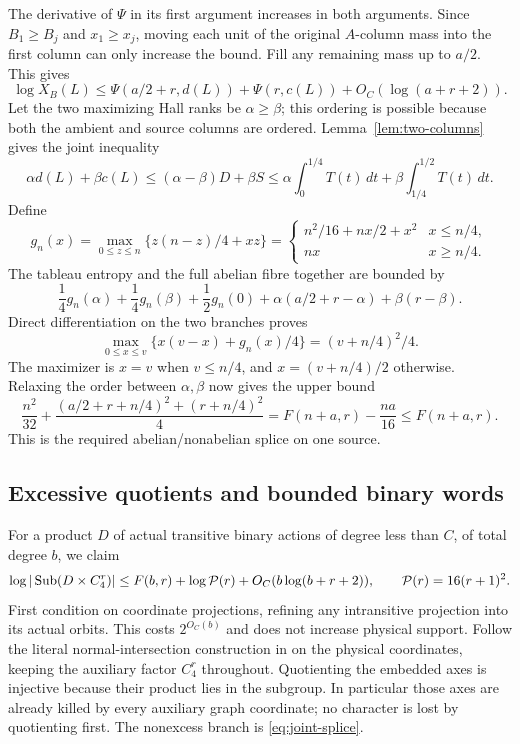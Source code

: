The derivative of $\Psi$ in its first argument increases in both
arguments. Since $B_1\geq B_j$ and $x_1\geq x_j$, moving each unit
of the original $A$-column mass into the first column can only increase
the bound. Fill any remaining mass up to $a/2$. This gives
\begin{equation}\label{eq:packet-columns}
 \log X_B(L)\leq\Psi(a/2+r,d(L))+\Psi(r,c(L))
                              +O_C(\log(a+r+2)).
\end{equation}
Let the two maximizing Hall ranks be $\alpha\geq\beta$; this ordering
is possible because both the ambient and source columns are ordered.
Lemma~\ref{lem:two-columns} gives the joint inequality
\[
 \alpha d(L)+\beta c(L)
 \leq(\alpha-\beta)D+\beta S
 \leq\alpha\int_0^{1/4}T(t)\,dt
         +\beta\int_{1/4}^{1/2}T(t)\,dt.
\]
Define
\[
 g_n(x)=\max_{0\leq z\leq n}\{z(n-z)/4+xz\}
 =\begin{cases}n^2/16+nx/2+x^2&x\leq n/4,\\nx&x\geq n/4.\end{cases}
\]
The tableau entropy and the full abelian fibre together are bounded by
\[
 \frac14g_n(\alpha)+\frac14g_n(\beta)+\frac12g_n(0)
       +\alpha(a/2+r-\alpha)+\beta(r-\beta).
\]
Direct differentiation on the two branches proves
\[
 \max_{0\leq x\leq v}\{x(v-x)+g_n(x)/4\}
       =(v+n/4)^2/4.
\]
The maximizer is $x=v$ when $v\leq n/4$, and
$x=(v+n/4)/2$ otherwise. Relaxing the order between $\alpha,\beta$
now gives the upper bound
\begin{equation}\label{eq:joint-splice}
 \frac{n^2}{32}
 +\frac{(a/2+r+n/4)^2+(r+n/4)^2}{4}
 =F(n+a,r)-\frac{na}{16}\leq F(n+a,r).
\end{equation}
This is the required abelian/nonabelian splice on one source.

\subsection{Excessive quotients and bounded binary words}
For a product $D$ of actual transitive binary actions of degree less
than $C$, of total degree $b$, we claim
\begin{equation}\label{eq:bounded-C4}
 \log|\operatorname{Sub}(D\times C_4^r)|
       \leq F(b,r)+\log\mathcal P(r)+O_C(b\log(b+r+2)),
 \qquad \mathcal P(r)=16(r+1)^2.
\end{equation}
First condition on coordinate projections, refining any intransitive
projection into its actual orbits. This costs $2^{O_C(b)}$ and does
not increase physical support. Follow the literal normal-intersection
construction in \cite[Proposition 7.4]{RoneyDougalTracey2025} on the
physical coordinates, keeping the auxiliary factor $C_4^r$ throughout.
Quotienting the embedded axes is injective because their product lies
in the subgroup. In particular those axes are already killed by every
auxiliary graph coordinate; no character is lost by quotienting first.
The nonexcess branch is \eqref{eq:joint-splice}.

